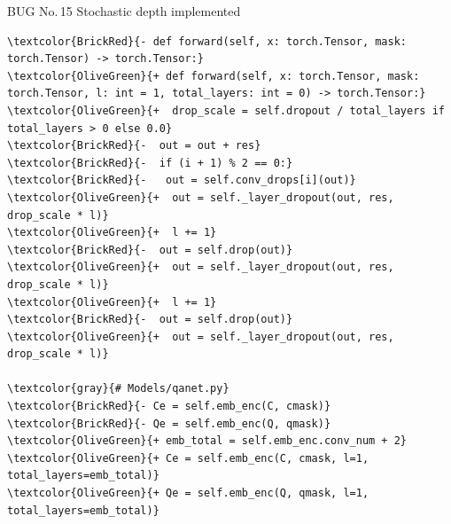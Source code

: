 \documentclass[10pt]{article}
\begin{document}
\begin{bugbox}{BUG No.\,15 \quad Stochastic depth implemented}
\begin{Verbatim}[commandchars=\\\{\},fontsize=\footnotesize,breaklines=true,breaksymbol={},frame=leftline,framerule=2pt,rulecolor=\color{gray!40},xleftmargin=6pt,formatcom=\singlespacing]
\textcolor{BrickRed}{- def forward(self, x: torch.Tensor, mask: torch.Tensor) -> torch.Tensor:}
\textcolor{OliveGreen}{+ def forward(self, x: torch.Tensor, mask: torch.Tensor, l: int = 1, total_layers: int = 0) -> torch.Tensor:}
\textcolor{OliveGreen}{+  drop_scale = self.dropout / total_layers if total_layers > 0 else 0.0}
\textcolor{BrickRed}{-  out = out + res}
\textcolor{BrickRed}{-  if (i + 1) % 2 == 0:}
\textcolor{BrickRed}{-   out = self.conv_drops[i](out)}
\textcolor{OliveGreen}{+  out = self._layer_dropout(out, res, drop_scale * l)}
\textcolor{OliveGreen}{+  l += 1}
\textcolor{BrickRed}{-  out = self.drop(out)}
\textcolor{OliveGreen}{+  out = self._layer_dropout(out, res, drop_scale * l)}
\textcolor{OliveGreen}{+  l += 1}
\textcolor{BrickRed}{-  out = self.drop(out)}
\textcolor{OliveGreen}{+  out = self._layer_dropout(out, res, drop_scale * l)}

\textcolor{gray}{# Models/qanet.py}
\textcolor{BrickRed}{- Ce = self.emb_enc(C, cmask)}
\textcolor{BrickRed}{- Qe = self.emb_enc(Q, qmask)}
\textcolor{OliveGreen}{+ emb_total = self.emb_enc.conv_num + 2}
\textcolor{OliveGreen}{+ Ce = self.emb_enc(C, cmask, l=1, total_layers=emb_total)}
\textcolor{OliveGreen}{+ Qe = self.emb_enc(Q, qmask, l=1, total_layers=emb_total)}
 

\end{Verbatim}
\end{bugbox}
\end{document}
